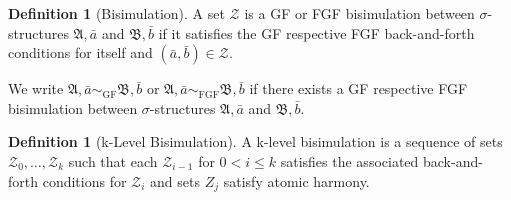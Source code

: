 \documentclass[draft]{scrartcl}
\theoremstyle{definition}
\newtheorem{definition}[theorem]{Definition}
\begin{document}
\begin{definition}[Bisimulation]
A set $\mathcal{Z}$ is a GF or FGF bisimulation between $\sigma$-structures $\mathfrak{A}, \bar{a}$ and $\mathfrak{B}, \bar{b}$ if it satisfies the GF respective FGF back-and-forth conditions for itself and $(\bar{a}, \bar{b}) \in \mathcal{Z}$.
\end{definition}

We write $\mathfrak{A}, \bar{a} \sim_{\textrm{GF}} \mathfrak{B}, \bar{b}$ or $\mathfrak{A}, \bar{a} \sim_{\textrm{FGF}} \mathfrak{B}, \bar{b}$ if there exists a GF respective FGF bisimulation between $\sigma$-structures $\mathfrak{A}, \bar{a}$ and $\mathfrak{B}, \bar{b}$.

\begin{definition}[k-Level Bisimulation]
A k-level bisimulation is a sequence of sets $\mathcal{Z}_0, \ldots, \mathcal{Z}_k$ such that each $\mathcal{Z}_{i - 1}$ for $0 < i \le k$ satisfies the associated back-and-forth conditions for $\mathcal{Z}_i$ and sets $Z_{j}$ satisfy atomic harmony.
\end{definition}
\end{document}
